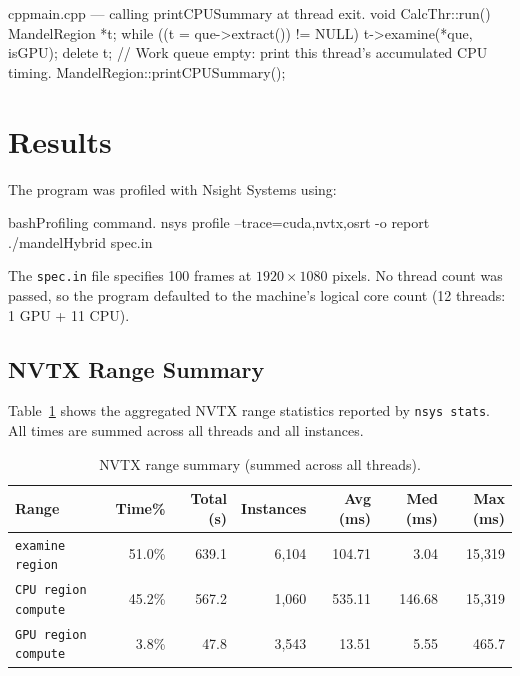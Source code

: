 \documentclass[
	english,
	letterpaper, oneside
]{article}
\begin{document}
\begin{sourcecode}{cpp}{main.cpp — calling printCPUSummary at thread exit.}
void CalcThr::run()
{
    MandelRegion *t;
    while ((t = que->extract()) != NULL)
    {
        t->examine(*que, isGPU);
        delete t;
    }
    // Work queue empty: print this thread's accumulated CPU timing.
    MandelRegion::printCPUSummary();
}
\end{sourcecode}

\section{Results}

The program was profiled with Nsight Systems using:

\begin{sourcecode}{bash}{Profiling command.}
nsys profile --trace=cuda,nvtx,osrt -o report ./mandelHybrid spec.in
\end{sourcecode}

The \texttt{spec.in} file specifies 100 frames at $1920\times1080$ pixels.
No thread count was passed, so the program defaulted to the machine's
logical core count (12 threads: 1 GPU + 11 CPU).

\subsection{NVTX Range Summary}

Table~\ref{tab:nvtx} shows the aggregated NVTX range statistics reported
by \texttt{nsys stats}. All times are summed across all threads and all
instances.

\begin{table}[H]
    \centering
    \caption{NVTX range summary (summed across all threads).}
    \label{tab:nvtx}
    \begin{tabular}{lrrrrrr}
        \hline
        \textbf{Range} & \textbf{Time\%} & \textbf{Total (s)} & \textbf{Instances} & \textbf{Avg (ms)} & \textbf{Med (ms)} & \textbf{Max (ms)} \\
        \hline
        \texttt{examine region}     & 51.0\% & 639.1 & 6{,}104  & 104.71 &   3.04 & 15{,}319 \\
        \texttt{CPU region compute} & 45.2\% & 567.2 & 1{,}060  & 535.11 & 146.68 & 15{,}319 \\
        \texttt{GPU region compute} &  3.8\% &  47.8 & 3{,}543  &  13.51 &   5.55 &    465.7 \\
        \hline
    \end{tabular}
\end{table}
\end{document}
